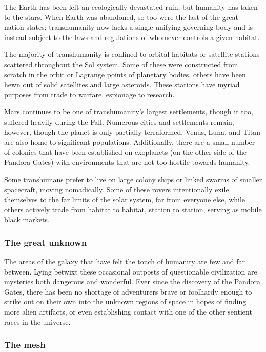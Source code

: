 The Earth has been left an ecologically-devastated ruin, but humanity
has taken to the stars. When Earth was abandoned, so too were the last
of the great nation-states; transhumanity now lacks a single unifying
governing body and is instead subject to the laws and regulations of
whomever controls a given habitat.

The majority of transhumanity is confined to orbital habitats or
satellite stations scattered throughout the Sol system. Some of these
were constructed from scratch in the orbit or Lagrange points of
planetary bodies, others have been hewn out of solid satellites and
large asteroids. These stations have myriad purposes from trade to
warfare, espionage to research.

Mars continues to be one of transhumanity's largest settlements,
though it too, suffered heavily during the Fall. Numerous cities and
settlements remain, however, though the planet is only partially
terraformed. Venus, Luna, and Titan are also home to significant
populations. Additionally, there are a small number of colonies that
have been established on exoplanets (on the other side of the Pandora
Gates) with environments that are not too hostile towards humanity.

Some transhumans prefer to live on large colony ships or linked swarms
of smaller spacecraft, moving nomadically. Some of these rovers
intentionally exile themselves to the far limits of the solar system,
far from everyone else, while others actively trade from habitat to
habitat, station to station, serving as mobile black markets.

\subsubsection{The great unknown}
\label{sec:great-unknown}

The areas of the galaxy that have felt the touch of humanity are few
and far between. Lying betwixt these occasional outposts of
questionable civilization are mysteries both dangerous and
wonderful. Ever since the discovery of the Pandora Gates, there has
been no shortage of adventurers brave or foolhardy enough to strike
out on their own into the unknown regions of space in hopes of finding
more alien artifacts, or even establishing contact with one of the
other sentient races in the universe.

\subsubsection{The mesh}
\label{sec:mesh}

